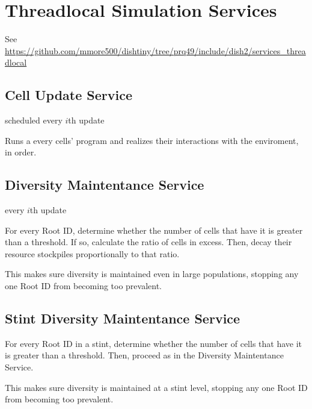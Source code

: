 \section{Threadlocal Simulation Services}

See \url{https://github.com/mmore500/dishtiny/tree/prq49/include/dish2/services_threadlocal}

\subsection{Cell Update Service}

scheduled every $i$th update

Runs a every cells' program and realizes their interactions with the enviroment, in order.

\subsection{Diversity Maintentance Service}

every $i$th update

For every Root ID, determine whether the number of cells that have it is greater than a threshold.
If so, calculate the ratio of cells in excess.
Then, decay their resource stockpiles proportionally to that ratio.

This makes sure diversity is maintained even in large populations, stopping any one Root ID from becoming too prevalent.

\subsection{Stint Diversity Maintentance Service}

For every Root ID in a stint, determine whether the number of cells that have it is greater than a threshold.
Then, proceed as in the Diversity Maintentance Service.

This makes sure diversity is maintained at a stint level, stopping any one Root ID from becoming too prevalent.
